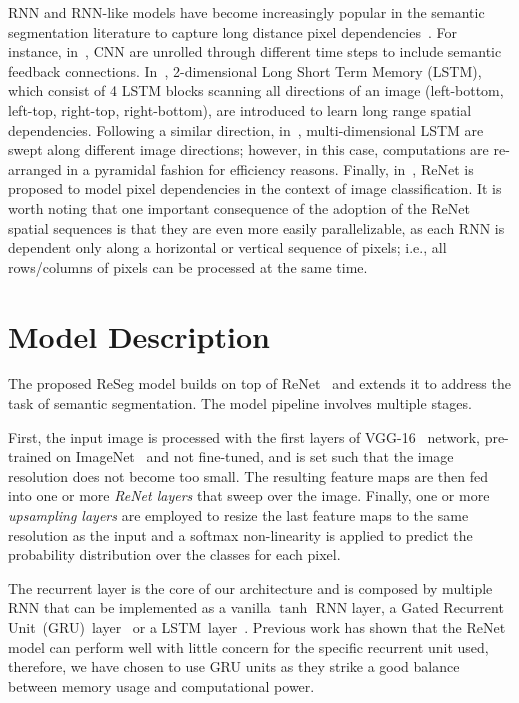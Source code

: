 RNN and RNN-like models have become increasingly popular in the semantic
segmentation literature to capture long distance pixel
dependencies~\cite{Pinheiro:2014, Gatta14-deepvision,
byeon2015scene,stollenga2015parallel}. For instance, in~\cite{Pinheiro:2014,
Gatta14-deepvision}, CNN are unrolled through different time steps to include
semantic feedback connections. In~\cite{byeon2015scene}, 2-dimensional Long
Short Term Memory (LSTM), which consist of 4 LSTM blocks
scanning all directions of an image (left-bottom, left-top, right-top, right-bottom),
are introduced to learn long range spatial dependencies. Following a similar direction,
in~\cite{stollenga2015parallel}, multi-dimensional LSTM are swept along
different image directions; however, in this case, computations are re-arranged
in a pyramidal fashion for efficiency reasons. Finally,
in~\cite{visin2015renet}, ReNet is proposed to model pixel dependencies in the
context of image classification. It is worth noting that one important
consequence of the adoption of the ReNet spatial sequences is that they are
even more easily parallelizable, as each RNN is dependent only along a horizontal or
vertical sequence of pixels; i.e., all rows/columns of pixels can be processed
at the same time.

\section{Model Description}\label{sec:reseg_model}

The proposed ReSeg model builds on top of ReNet~\cite{visin2015renet} and
extends it to address the task of semantic segmentation. The model
pipeline involves multiple stages.

First, the input image is processed with the first layers of
VGG-16~\cite{Simonyan2015} network, pre-trained on
ImageNet~\cite{imagenet_cvpr09} and not fine-tuned, and is set such that the
image resolution does not become too small. The resulting feature maps are then
fed into one or more \emph{ReNet layers} that sweep over the image. Finally,
one or more \emph{upsampling layers} are employed to resize the last feature
maps to the same resolution as the input and a softmax non-linearity is applied
to predict the probability distribution over the classes for each pixel.

The recurrent layer is the core of our architecture and is composed by multiple
RNN that can be implemented as a vanilla $\tanh$ RNN layer, a Gated Recurrent
Unit~(GRU)~layer~\cite{Cho2014} or a
LSTM~layer~\cite{Hochreiter+Schmidhuber-1997}. Previous work has shown that
the ReNet model can perform well with little concern for the specific recurrent
unit used, therefore, we have chosen to use GRU units as they strike a good
balance between memory usage and computational power.

